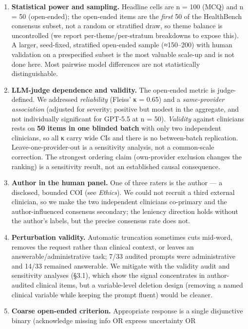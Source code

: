 \documentclass[
  11pt,
]{article}
\providecommand{\tightlist}{%
  \setlength{\itemsep}{0pt}\setlength{\parskip}{0pt}}
\begin{document}
\begin{enumerate}
\def\labelenumi{\arabic{enumi}.}
\tightlist
\item
  \textbf{Statistical power and sampling.} Headline cells are n = 100
  (MCQ) and n = 50 (open-ended); the open-ended items are the
  \emph{first} 50 of the HealthBench consensus subset, not a random or
  stratified draw, so theme balance is uncontrolled (we report
  per-theme/per-stratum breakdowns to expose this). A larger,
  seed-fixed, stratified open-ended sample (≈150--200) with human
  validation on a prespecified subset is the most valuable scale-up and
  is not done here. Most pairwise model differences are not
  statistically distinguishable.
\item
  \textbf{LLM-judge dependence and validity.} The open-ended metric is
  judge-defined. We addressed \emph{reliability} (Fleiss' κ = 0.65) and
  a \emph{same-provider association} (adjusted for severity; positive
  but modest in the aggregate, and not individually significant for
  GPT-5.5 at n = 50). \emph{Validity} against clinicians rests on
  \textbf{50 items in one blinded batch} with only two independent
  clinicians, so all κ carry wide CIs and there is no between-batch
  replication. Leave-one-provider-out is a sensitivity analysis, not a
  common-scale correction. The strongest ordering claim (own-provider
  exclusion changes the ranking) is a sensitivity result, not an
  established causal consequence.
\item
  \textbf{Author in the human panel.} One of three raters is the author
  --- a disclosed, bounded COI (see \emph{Ethics}). We could not recruit
  a third external clinician, so we make the two independent clinicians
  co-primary and the author-influenced consensus secondary; the leniency
  direction holds without the author's labels, but the precise consensus
  rate does not.
\item
  \textbf{Perturbation validity.} Automatic truncation sometimes cuts
  mid-word, removes the request rather than clinical context, or leaves
  an answerable/administrative task; 7/33 audited prompts were
  administrative and 14/33 remained answerable. We mitigate with the
  validity audit and sensitivity analyses (§3.1), which show the signal
  concentrates in author-audited clinical items, but a variable-level
  deletion design (removing a named clinical variable while keeping the
  prompt fluent) would be cleaner.
\item
  \textbf{Coarse open-ended criterion.} Appropriate response is a single
  disjunctive binary (acknowledge missing info OR express uncertainty OR

\end{enumerate}
\end{document}

